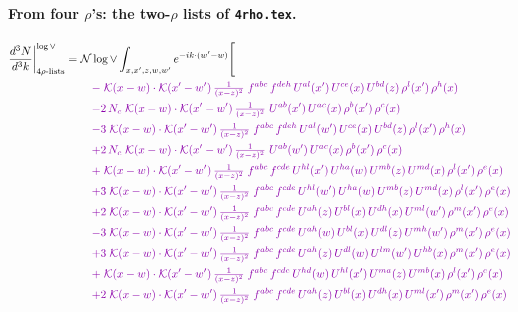 \documentclass[10pt]{article}
\numberwithin{equation}{section}
\newcommand{\NNv}{\mathcal N\log\vee}
\begin{document}
\paragraph{From four $\rho$'s: the two-$\rho$ lists of \texttt{4rho.tex}.}
\begin{align}
\frac{d^3N}{d^3k}\bigg|^{\log\vee}_{4\rho\text{-lists}}={}&\NNv\int_{x,x',z,w,w'}e^{-ik\cdot(w'-w)}\Bigg[\notag\\
&\quad{\color{CC}-\;\mathcal{K}(x-w)\cdot\mathcal{K}(x'-w')\,\tfrac{1}{(x-z)^{2}}\;f^{abc}\,f^{deh}\,U^{al}(x')\,U^{ce}(x)\,U^{bd}(z)\,\rho^{l}(x')\,\rho^{h}(x)}\notag\\
&\quad{\color{CC}-2\,N_c\;\mathcal{K}(x-w)\cdot\mathcal{K}(x'-w')\,\tfrac{1}{(x-z)^{2}}\;U^{ab}(x')\,U^{ac}(x)\,\rho^{b}(x')\,\rho^{c}(x)}\notag\\
&\quad{\color{CC}-3\;\mathcal{K}(x-w)\cdot\mathcal{K}(x'-w')\,\tfrac{1}{(x-z)^{2}}\;f^{abc}\,f^{deh}\,U^{al}(w')\,U^{ce}(x)\,U^{bd}(z)\,\rho^{l}(x')\,\rho^{h}(x)}\notag\\
&\quad{\color{CC}+2\,N_c\;\mathcal{K}(x-w)\cdot\mathcal{K}(x'-w')\,\tfrac{1}{(x-z)^{2}}\;U^{ab}(w')\,U^{ac}(x)\,\rho^{b}(x')\,\rho^{c}(x)}\notag\\
&\quad{\color{CC}+\;\mathcal{K}(x-w)\cdot\mathcal{K}(x'-w')\,\tfrac{1}{(x-z)^{2}}\;f^{abc}\,f^{cde}\,U^{hl}(x')\,U^{ha}(w)\,U^{mb}(z)\,U^{md}(x)\,\rho^{l}(x')\,\rho^{e}(x)}\notag\\
&\quad{\color{CC}+3\;\mathcal{K}(x-w)\cdot\mathcal{K}(x'-w')\,\tfrac{1}{(x-z)^{2}}\;f^{abc}\,f^{cde}\,U^{hl}(w')\,U^{ha}(w)\,U^{mb}(z)\,U^{md}(x)\,\rho^{l}(x')\,\rho^{e}(x)}\notag\\
&\quad{\color{CC}+2\;\mathcal{K}(x-w)\cdot\mathcal{K}(x'-w')\,\tfrac{1}{(x-z)^{2}}\;f^{abc}\,f^{cde}\,U^{ah}(z)\,U^{bl}(x)\,U^{dh}(x)\,U^{ml}(w')\,\rho^{m}(x')\,\rho^{e}(x)}\notag\\
&\quad{\color{CC}-3\;\mathcal{K}(x-w)\cdot\mathcal{K}(x'-w')\,\tfrac{1}{(x-z)^{2}}\;f^{abc}\,f^{cde}\,U^{ah}(w)\,U^{bl}(x)\,U^{dl}(z)\,U^{mh}(w')\,\rho^{m}(x')\,\rho^{e}(x)}\notag\\
&\quad{\color{CC}+3\;\mathcal{K}(x-w)\cdot\mathcal{K}(x'-w')\,\tfrac{1}{(x-z)^{2}}\;f^{abc}\,f^{cde}\,U^{ah}(z)\,U^{dl}(w)\,U^{lm}(w')\,U^{hb}(x)\,\rho^{m}(x')\,\rho^{e}(x)}\notag\\
&\quad{\color{CC}+\;\mathcal{K}(x-w)\cdot\mathcal{K}(x'-w')\,\tfrac{1}{(x-z)^{2}}\;f^{abc}\,f^{cde}\,U^{hd}(w)\,U^{hl}(x')\,U^{ma}(z)\,U^{mb}(x)\,\rho^{l}(x')\,\rho^{e}(x)}\notag\\
&\quad{\color{CC}+2\;\mathcal{K}(x-w)\cdot\mathcal{K}(x'-w')\,\tfrac{1}{(x-z)^{2}}\;f^{abc}\,f^{cde}\,U^{ah}(z)\,U^{bl}(x)\,U^{dh}(x)\,U^{ml}(x')\,\rho^{m}(x')\,\rho^{e}(x)}\notag\\

\end{align}
\end{document}
